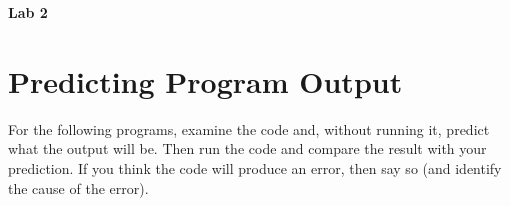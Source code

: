 \documentclass{article}
\begin{document}
\fancyfoot[C]{\thepage}
\vspace*{0cm}
\begin{center}
	{\LARGE \textbf{Lab 2}}\\
	\vspace{.25cm}
\end{center}

\section*{Predicting Program Output}
For the following programs, examine the code and, without running it, predict what the output will be. Then run the code and compare the result with your prediction. If you think the code will produce an error, then say so (and identify the cause of the error).
\end{document}

